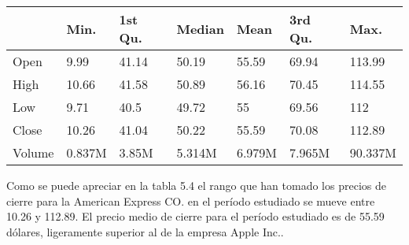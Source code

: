 \documentclass[]{article}
\begin{document}
\begin{table}[H]
\centering\begingroup\fontsize{10}{12}\selectfont

\begin{tabular}{l|l|l|l|l|l|l}
\hline
  & Min. & 1st Qu. & Median & Mean & 3rd Qu. & Max.\\
\hline
Open & 9.99 & 41.14 & 50.19 & 55.59 & 69.94 & 113.99\\
\hline
High & 10.66 & 41.58 & 50.89 & 56.16 & 70.45 & 114.55\\
\hline
Low & 9.71 & 40.5 & 49.72 & 55 & 69.56 & 112\\
\hline
Close & 10.26 & 41.04 & 50.22 & 55.59 & 70.08 & 112.89\\
\hline
Volume & 0.837M & 3.85M & 5.314M & 6.979M & 7.965M & 90.337M\\
\hline
\end{tabular}\endgroup{}
\end{table}

\setlength\parskip{5ex}
\justifying

Como se puede apreciar en la tabla 5.4 el rango que han tomado los
precios de cierre para la American Express CO. en el período estudiado
se mueve entre 10.26 y 112.89. El precio medio de cierre para el período
estudiado es de 55.59 dólares, ligeramente superior al de la empresa
Apple Inc..
\end{document}

